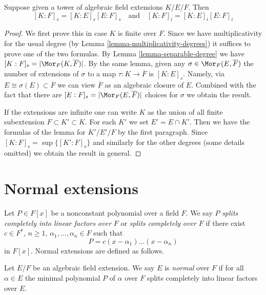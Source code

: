 \begin{lemma}[Multiplicativity]
\label{lemma-multiplicativity-all-degrees}
Suppose given a tower of algebraic field extensions $K/E/F$. Then
$$
[K : F]_s = [K : E]_s [E : F]_s
\quad\text{and}\quad
[K : F]_i = [K : E]_i [E : F]_i
$$
\end{lemma}

\begin{proof}
We first prove this in case $K$ is finite over $F$. Since we have
multiplicativity for the usual degree (by
Lemma \ref{lemma-multiplicativity-degrees}) it suffices to prove
one of the two formulas. By Lemma \ref{lemma-separable-degree} we have
$[K : F]_s = |\Mor_F(K, \overline{F})|$. By the same lemma,
given any $\sigma \in \Mor_F(E, \overline{F})$ the number of extensions
of $\sigma$ to a map $\tau : K \to \overline{F}$ is $[K : E]_s$.
Namely, via $E \cong \sigma(E) \subset \overline{F}$ we can view
$\overline{F}$ as an algebraic closure of $E$. Combined with the
fact that there are $[E : F]_s = |\Mor_F(E, \overline{F})|$ choices
for $\sigma$ we obtain the result.

\medskip\noindent
If the extensions are infinite one can write $K$ as the union
of all finite subextension $F \subset K' \subset K$. For each
$K'$ we set $E' = E \cap K'$. Then we have the formulas of the
lemma for $K'/E'/F$ by the first paragraph. Since
$[K : F]_s = \sup \{[K' : F]_s\}$ and similarly for the other
degrees (some details omitted) we obtain the result in general.
\end{proof}









\section{Normal extensions}
\label{section-normal}

\noindent
Let $P \in F[x]$ be a nonconstant polynomial over a field $F$. We say $P$
{\it splits completely into linear factors over $F$} or
{\it splits completely over $F$} if there exist
$c \in F^*$, $n \geq 1$, $\alpha_1, \ldots, \alpha_n \in F$ such that
$$
P = c(x - \alpha_1) \ldots (x - \alpha_n)
$$
in $F[x]$. Normal extensions are defined as follows.

\begin{definition}
\label{definition-normal}
Let $E/F$ be an algebraic field extension. We say $E$ is {\it normal}
over $F$ if for all $\alpha \in E$ the minimal polynomial $P$
of $\alpha$ over $F$ splits completely into linear factors over $E$.
\end{definition}

